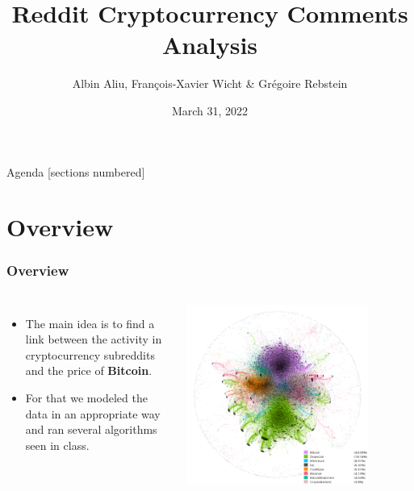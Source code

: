 \documentclass[aspectratio=169]{beamer}
\title{Reddit Cryptocurrency Comments Analysis}
\date{March 31, 2022}
\author{Albin Aliu, François-Xavier Wicht \& Grégoire Rebstein}
\institute{Social Media Analytics}
\begin{document}
\maketitle

\begin{frame}{Agenda}
    [sections numbered]
    \tableofcontents
\end{frame}
\section{Overview}
\begin{frame}[t]
    \frametitle{Overview}
    \begin{columns}
        \begin{itemize}
            \item The main idea is to find a link between the activity in cryptocurrency subreddits and the price of \textbf{Bitcoin}.
            \item For that we modeled the data in an appropriate way and ran several algorithms seen in class.
        \end{itemize}
        \includegraphics[width=0.8\textwidth]{figures/subreddits_labelled.png}
    \end{columns}
\end{frame}
\end{document}
